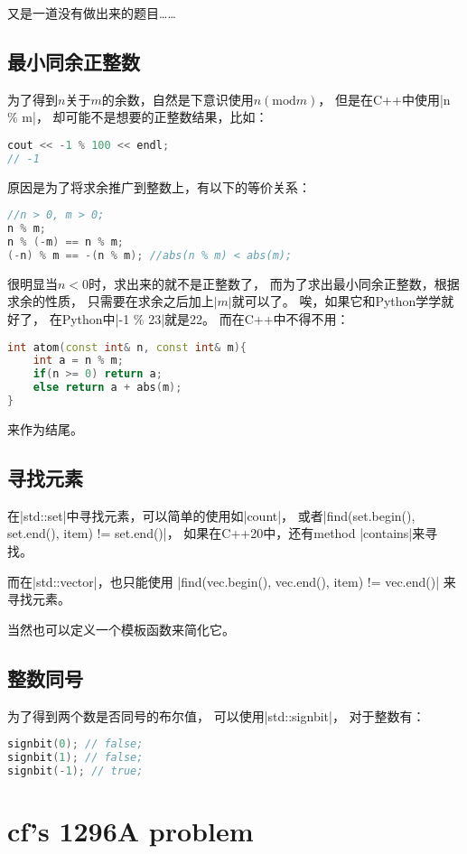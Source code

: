 又是一道没有做出来的题目\ldots\ldots

\subsection{最小同余正整数}
为了得到$n$关于$m$的余数，自然是下意识使用$n (\text{mod} m)$，
但是在C++中使用\vb|n \% m|，
却可能不是想要的正整数结果，比如：
\begin{lstlisting}[language=C++]
cout << -1 % 100 << endl;
// -1
\end{lstlisting}

原因是为了将求余推广到整数上，有以下的等价关系：
\begin{lstlisting}[language=C++]
//n > 0, m > 0;
n % m;
n % (-m) == n % m;
(-n) % m == -(n % m); //abs(n % m) < abs(m);
\end{lstlisting}
很明显当$n<0$时，求出来的就不是正整数了，
而为了求出最小同余正整数，根据求余的性质，
只需要在求余之后加上$|m|$就可以了。
唉，如果它和Python学学就好了，
在Python中\vb|-1 \% 23|就是22。
而在C++中不得不用：
\begin{lstlisting}[language=C++]
int atom(const int& n, const int& m){
    int a = n % m;
    if(n >= 0) return a;
    else return a + abs(m);
}
\end{lstlisting}
来作为结尾。

\subsection{寻找元素}
在\vb|std::set|中寻找元素，可以简单的使用如\vb|count|，
或者\vb|find(set.begin(), set.end(), item) != set.end()|，
如果在C++20中，还有method \vb|contains|来寻找。

而在\vb|std::vector|，也只能使用
\vb|find(vec.begin(), vec.end(), item) != vec.end()|
来寻找元素。

当然也可以定义一个模板函数来简化它。

\subsection{整数同号}
为了得到两个数是否同号的布尔值，
可以使用\vb|std::signbit|，
对于整数有：
\begin{lstlisting}[language=C++]
signbit(0); // false;
signbit(1); // false;
signbit(-1); // true;
\end{lstlisting}



\section{cf's 1296A problem}

